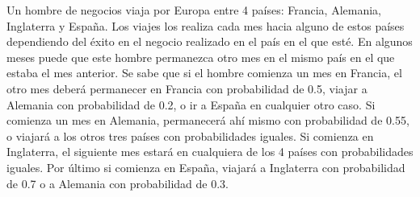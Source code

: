 
Un hombre de negocios viaja por Europa entre 4 países: Francia, Alemania, Inglaterra y España. Los viajes los realiza cada mes hacia alguno de estos países dependiendo del éxito en el negocio realizado en el país en el que esté. En algunos meses puede que este hombre permanezca otro mes en el mismo país en el que estaba el mes anterior. Se sabe que si el hombre comienza un mes en Francia, el otro mes deberá permanecer en Francia con probabilidad de 0.5, viajar a Alemania con probabilidad de 0.2, o ir a España en cualquier otro caso. Si comienza un mes en Alemania, permanecerá ahí mismo con probabilidad de 0.55, o viajará a los otros tres países con probabilidades iguales. Si comienza en Inglaterra, el siguiente mes estará en cualquiera de los 4 países con probabilidades iguales. Por último si comienza en España, viajará a Inglaterra con probabilidad de 0.7 o a Alemania con probabilidad de 0.3. 

